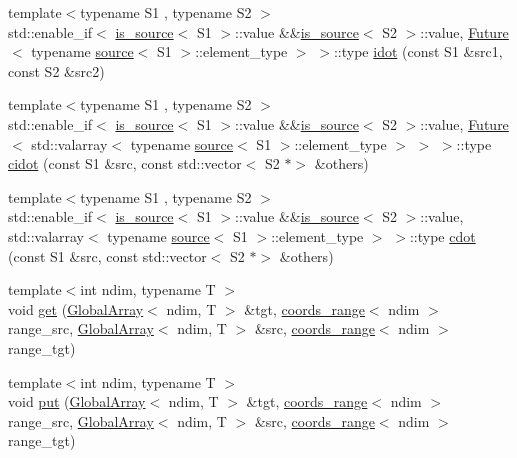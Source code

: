 \begin{DoxyCompactItemize}
\item 
{\footnotesize template$<$typename S1 , typename S2 $>$ }\\std\+::enable\+\_\+if$<$ \hyperlink{classshark_1_1ndim_1_1is__source}{is\+\_\+source}$<$ S1 $>$\+::value \&\&\hyperlink{classshark_1_1ndim_1_1is__source}{is\+\_\+source}$<$ S2 $>$\+::value, \hyperlink{structshark_1_1_future}{Future}$<$ typename \hyperlink{structshark_1_1ndim_1_1source}{source}$<$ S1 $>$\+::element\+\_\+type $>$ $>$\+::type \hyperlink{namespaceshark_1_1ndim_ac03f6c0b503e2edea1872c3c62bc56cf}{idot} (const S1 \&src1, const S2 \&src2)
\item 
{\footnotesize template$<$typename S1 , typename S2 $>$ }\\std\+::enable\+\_\+if$<$ \hyperlink{classshark_1_1ndim_1_1is__source}{is\+\_\+source}$<$ S1 $>$\+::value \&\&\hyperlink{classshark_1_1ndim_1_1is__source}{is\+\_\+source}$<$ S2 $>$\+::value, \hyperlink{structshark_1_1_future}{Future}$<$ std\+::valarray$<$ typename \hyperlink{structshark_1_1ndim_1_1source}{source}$<$ S1 $>$\+::element\+\_\+type $>$ $>$ $>$\+::type \hyperlink{namespaceshark_1_1ndim_aae51185f130890d0d852dbafb8efd05b}{cidot} (const S1 \&src, const std\+::vector$<$ S2 $\ast$$>$ \&others)
\item 
{\footnotesize template$<$typename S1 , typename S2 $>$ }\\std\+::enable\+\_\+if$<$ \hyperlink{classshark_1_1ndim_1_1is__source}{is\+\_\+source}$<$ S1 $>$\+::value \&\&\hyperlink{classshark_1_1ndim_1_1is__source}{is\+\_\+source}$<$ S2 $>$\+::value, std\+::valarray$<$ typename \hyperlink{structshark_1_1ndim_1_1source}{source}$<$ S1 $>$\+::element\+\_\+type $>$ $>$\+::type \hyperlink{namespaceshark_1_1ndim_af41287806ba7a4ab84540e6611a046e7}{cdot} (const S1 \&src, const std\+::vector$<$ S2 $\ast$$>$ \&others)
\item 
{\footnotesize template$<$int ndim, typename T $>$ }\\void \hyperlink{namespaceshark_1_1ndim_a8a52bf045ab40d975bd382067a266ee8}{get} (\hyperlink{classshark_1_1ndim_1_1_global_array}{Global\+Array}$<$ ndim, T $>$ \&tgt, \hyperlink{structshark_1_1ndim_1_1coords__range}{coords\+\_\+range}$<$ ndim $>$ range\+\_\+src, \hyperlink{classshark_1_1ndim_1_1_global_array}{Global\+Array}$<$ ndim, T $>$ \&src, \hyperlink{structshark_1_1ndim_1_1coords__range}{coords\+\_\+range}$<$ ndim $>$ range\+\_\+tgt)
\item 
{\footnotesize template$<$int ndim, typename T $>$ }\\void \hyperlink{namespaceshark_1_1ndim_afb46dbb15b06e4fc1fe871b457cc0695}{put} (\hyperlink{classshark_1_1ndim_1_1_global_array}{Global\+Array}$<$ ndim, T $>$ \&tgt, \hyperlink{structshark_1_1ndim_1_1coords__range}{coords\+\_\+range}$<$ ndim $>$ range\+\_\+src, \hyperlink{classshark_1_1ndim_1_1_global_array}{Global\+Array}$<$ ndim, T $>$ \&src, \hyperlink{structshark_1_1ndim_1_1coords__range}{coords\+\_\+range}$<$ ndim $>$ range\+\_\+tgt)

\end{DoxyCompactItemize}
